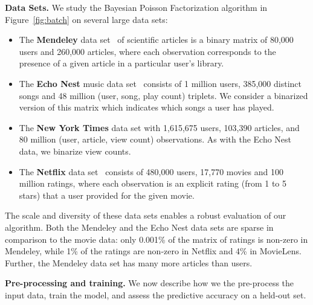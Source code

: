 {\bf Data Sets.} We study the Bayesian Poisson Factorization algorithm
in Figure~\ref{fig:batch} on several large data sets:
\begin{itemize}
\item The {\bf Mendeley} data set~\cite{Jack:2010} of scientific
  articles is a binary matrix of 80,000 users and 260,000 articles,
  where each observation corresponds to the presence of a given
  article in a particular user's library.
\item The {\bf Echo Nest} music data set~\cite{Bertin-Mahieux:2011}
  consists of 1 million users, 385,000 distinct songs and 48 million
  (user, song, play count) triplets. We consider a binarized version
  of this matrix which indicates which songs a user has played.
\item The {\bf New York Times} data set with 1,615,675 users, 103,390
  articles, and 80 million (user, article, view count)
  observations. As with the Echo Nest data, we binarize view counts.
\item The {\bf Netflix} data set~\cite{Koren:2009} consists of 480,000
  users, 17,770 movies and 100 million ratings, where each observation
  is an explicit rating (from 1 to 5 stars) that a user provided for
  the given movie.
\end{itemize}

The scale and diversity of these data sets enables a robust evaluation
of our algorithm. Both the Mendeley and the Echo Nest data sets are
sparse in comparison to the movie data: only 0.001\% of the matrix of
ratings is non-zero in Mendeley, while 1\% of the ratings are non-zero
in Netflix and 4\% in MovieLens. Further, the Mendeley data set has
many more articles than users.





{\bf Pre-processing and training.} We now describe how we the
pre-process the input data, train the model, and assess the predictive
accuracy on a held-out set.

